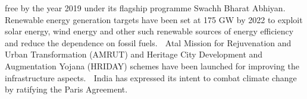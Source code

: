free by the year 2019 under its flagship programme Swachh Bharat Abhiyan.  Renewable energy generation targets have been set at 175 GW by 2022 to exploit solar energy, wind energy and other such renewable sources of energy efficiency and reduce the dependence on fossil fuels.  Atal Mission for Rejuvenation and Urban Transformation (AMRUT) and Heritage City Development and Augmentation Yojana (HRIDAY) schemes have been launched for improving the infrastructure aspects.  India has expressed its intent to combat climate change by ratifying the Paris Agreement. 